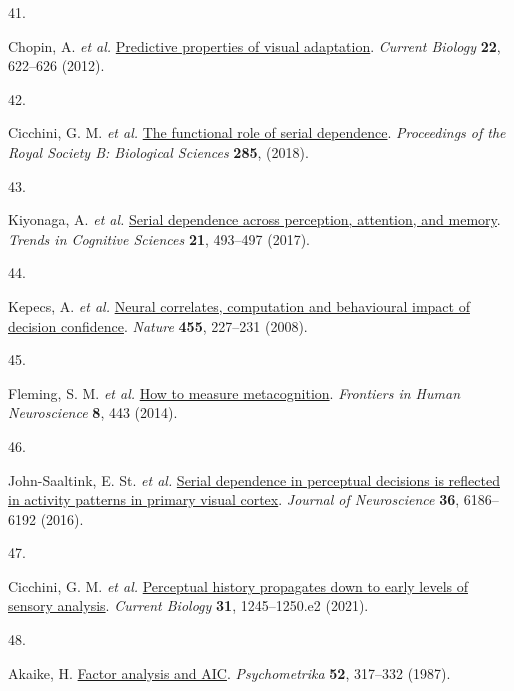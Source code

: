 \documentclass[
]{article}
\newlength{\cslhangindent}
\newlength{\csllabelwidth}
\newlength{\cslentryspacingunit} %
\newenvironment{CSLReferences}[2] %
 {%
  \setlength{\parindent}{0pt}
  \ifodd #1
  \let\oldpar\par
  \def\par{\hangindent=\cslhangindent\oldpar}
  \fi
  \setlength{\parskip}{#2\cslentryspacingunit}
 }%
 {}
\newcommand{\CSLLeftMargin}[1]{\parbox[t]{\csllabelwidth}{#1}}
\newcommand{\CSLRightInline}[1]{\parbox[t]{\linewidth - \csllabelwidth}{#1}\break}
\begin{document}
\begin{CSLReferences}{0}{0}
\leavevmode{}%
\CSLLeftMargin{41. }%
\CSLRightInline{Chopin, A. \emph{et al.}
\href{https://doi.org/10.1016/j.cub.2012.02.021}{Predictive properties
of visual adaptation}. \emph{Current Biology} \textbf{22}, 622--626
(2012).}

\leavevmode{}%
\CSLLeftMargin{42. }%
\CSLRightInline{Cicchini, G. M. \emph{et al.}
\href{https://doi.org/10.1098/rspb.2018.1722}{The functional role of
serial dependence}. \emph{Proceedings of the Royal Society B: Biological
Sciences} \textbf{285}, (2018).}

\leavevmode{}%
\CSLLeftMargin{43. }%
\CSLRightInline{Kiyonaga, A. \emph{et al.}
\href{https://doi.org/10.1016/j.tics.2017.04.011}{Serial dependence
across perception, attention, and memory}. \emph{Trends in Cognitive
Sciences} \textbf{21}, 493--497 (2017).}

\leavevmode{}%
\CSLLeftMargin{44. }%
\CSLRightInline{Kepecs, A. \emph{et al.}
\href{https://doi.org/10.1038/nature07200}{Neural correlates,
computation and behavioural impact of decision confidence}.
\emph{Nature} \textbf{455}, 227--231 (2008).}

\leavevmode{}%
\CSLLeftMargin{45. }%
\CSLRightInline{Fleming, S. M. \emph{et al.}
\href{https://doi.org/10.3389/fnhum.2014.00443}{How to measure
metacognition}. \emph{Frontiers in Human Neuroscience} \textbf{8}, 443
(2014).}

\leavevmode{}%
\CSLLeftMargin{46. }%
\CSLRightInline{John-Saaltink, E. St. \emph{et al.}
\href{https://doi.org/10.1523/JNEUROSCI.4390-15.2016}{Serial dependence
in perceptual decisions is reflected in activity patterns in primary
visual cortex}. \emph{Journal of Neuroscience} \textbf{36}, 6186--6192
(2016).}

\leavevmode{}%
\CSLLeftMargin{47. }%
\CSLRightInline{Cicchini, G. M. \emph{et al.}
\href{https://doi.org/10.1016/j.cub.2020.12.004}{Perceptual history
propagates down to early levels of sensory analysis}. \emph{Current
Biology} \textbf{31}, 1245--1250.e2 (2021).}

\leavevmode{}%
\CSLLeftMargin{48. }%
\CSLRightInline{Akaike, H.
\href{https://doi.org/10.1007/BF02294359}{Factor analysis and AIC}.
\emph{Psychometrika} \textbf{52}, 317--332 (1987).}


\end{CSLReferences}
\end{document}

